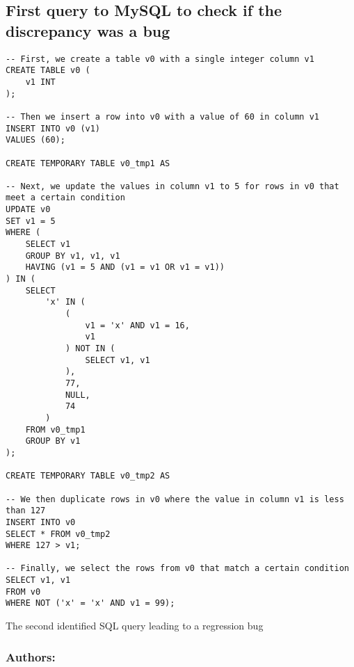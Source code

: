 \documentclass[sigconf]{acmart}
\begin{document}
\subsection{First query to MySQL to check if the discrepancy was a bug}
\begin{lstlisting}
-- First, we create a table v0 with a single integer column v1
CREATE TABLE v0 (
    v1 INT
);

-- Then we insert a row into v0 with a value of 60 in column v1
INSERT INTO v0 (v1) 
VALUES (60);

CREATE TEMPORARY TABLE v0_tmp1 AS

-- Next, we update the values in column v1 to 5 for rows in v0 that meet a certain condition
UPDATE v0 
SET v1 = 5 
WHERE (
    SELECT v1 
    GROUP BY v1, v1, v1 
    HAVING (v1 = 5 AND (v1 = v1 OR v1 = v1))
) IN (
    SELECT 
        'x' IN (
            (
                v1 = 'x' AND v1 = 16, 
                v1
            ) NOT IN (
                SELECT v1, v1
            ), 
            77, 
            NULL, 
            74
        ) 
    FROM v0_tmp1 
    GROUP BY v1
);

CREATE TEMPORARY TABLE v0_tmp2 AS

-- We then duplicate rows in v0 where the value in column v1 is less than 127
INSERT INTO v0 
SELECT * FROM v0_tmp2 
WHERE 127 > v1;

-- Finally, we select the rows from v0 that match a certain condition
SELECT v1, v1 
FROM v0 
WHERE NOT ('x' = 'x' AND v1 = 99);
\end{lstlisting}
\caption{The second identified SQL query leading to a regression bug}
\subsubsection{Authors:}
\end{document}
